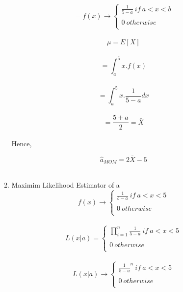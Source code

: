 \documentclass[11pt]{article}
\begin{document}
\begin{enumerate}
\begin{enumerate}
\begin{equation*}
= f(x) \rightarrow
\begin{cases}
\frac{1}{5-a}\  if \ a <x<b\\\\
0   \ otherwise\\
\end{cases}
\end{equation*}\\

$$\mu = E[X]$$\\

$$= \int_{a}^{5} x.f(x)$$\\ 

$$= \int_{a}^{5}  x.{\frac{1}{5-a}}dx$$\\

$$ = \dfrac{5+a}{2} = \bar X$$\\
Hence,

$$\hat a_{MOM} = 2\bar X - 5$$\\

\item
Maximim Likelihood Estimator of a\\

\begin{equation*}
f(x) \rightarrow
\begin{cases}
\frac{1}{b-a}\  if \ a <x<5\\\\
0   \ otherwise\\
\end{cases}
\end{equation*}\\

\begin{equation*}
L(x| a) =
\begin{cases}
\prod_{i=1}^{n}\frac{1}{5-a}\  if \ a < x < 5\\\\
0   \ otherwise\\
\end{cases}
\end{equation*}\\

\begin{equation*}
L(x|a) \rightarrow
\begin{cases}
{\frac{1}{5-a}}^n \  if \ a < x < 5\\\\
0   \ otherwise\\
\end{cases}
\end{equation*}\\


\end{enumerate}
\end{enumerate}
\end{document}
